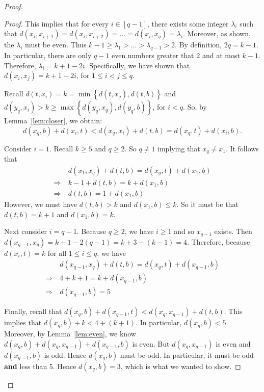 \documentclass[11pt,letter]{article}
\theoremstyle{remark}
\newcommand{\set}[1]{\left\{#1\right\}}
\begin{document}
\begin{proof}
\begin{proof}
        This implies that for every $i\in[q-1]$, there exists some integer $\lambda_i$ such that $d(x_i,x_{i+1})=d(x_i,x_{i+2})=\dots=d(x_i,x_q)=\lambda_i$. Moreover, as shown, the $\lambda_i$ must be even. Thus $k-1\geq \lambda_1> \dots > \lambda_{q-1}>2$. By definition, $2q=k-1$. In particular, there are only $q-1$ even numbers greater that $2$ and at most $k-1$. Therefore, $\lambda_i=k+1-2i$.
Specifically, we have shown that $d(x_i,x_j)=k+1-2i$, for $1\leq i<j\leq q$.
        
        Recall $d(t,x_i)=k=\min\set{d(t,x_q),d(t,b)}$ and $d(y_q,x_i)>k\geq \max\set{d(y_q,x_q),d(y_q,b)}$, for $i<q$. So, by Lemma~\ref{lem:closer}, we obtain:   
        \[d(x_q,b)+d(x_i,t)<d(x_q,x_i)+d(t,b)=d(x_q,t)+d(x_i,b).\] 

        Consider $i=1$. Recall $k\geq 5$ and $q\geq 2$. So $q\neq 1$ implying that $x_q\neq x_1$. It follows that
        \begin{align*}
            &\ d(x_1,x_q)+d(t,b)=d(x_q,t)+d(x_1,b)\\
            \Longrightarrow &\ k-1+d(t,b)=k+d(x_1,b)\\
            \Longrightarrow &\ d(t,b)=1+d(x_1,b)
        \end{align*}
        However, we must have $d(t,b)>k$ and $d(x_1,b)\leq k$. So it must be that $d(t,b)=k+1$ and $d(x_1,b)=k$.

        Next consider $i=q-1$. Because $q\geq 2$, we have $i\geq 1$ and so $x_{q-1}$ exists. Then $d(x_{q-1}, x_q) = k + 1 - 2(q - 1) = k + 3 - (k - 1) = 4$. Therefore, because $d(x_i, t)=k$ for all $1\le i\le q$, we have
        \begin{align*}
            &\ d(x_{q-1},x_{q})+d(t,b)=d(x_q,t)+d(x_{q-1},b)\\
            \Longrightarrow &\  4+k+1=k+d(x_{q-1},b)\\
            \Longrightarrow &\ d(x_{q-1},b)=5
        \end{align*}

        Finally, recall that $d(x_q,b)+d(x_{q-1},t) < d(x_q,x_{q-1})+d(t,b)$. This implies that $d(x_q,b)+ k<4+(k+1)$. 
        In particular,  $d(x_q,b) < 5$.
        Moreover, by Lemma~\ref{lem:even}, we know $d(x_q,b)+d(x_q,x_{q-1})+d(x_{q-1},b)$ is even. But $d(x_q,x_{q-1})$ is even and $d(x_{q-1},b)$ is odd.
        Hence $d(x_q,b)$ must be odd. In particular, it must be odd {\bf and} less than 5. Hence $d(x_q,b)=3$, which is what we wanted to show.
    \end{proof}


\end{proof}
\end{document}

